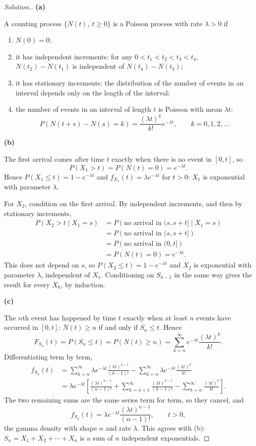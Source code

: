 \documentclass[11pt,a4paper]{article}
\theoremstyle{definition}
\newenvironment{solution}
  {\renewcommand{\qedsymbol}{}\begin{proof}[\textit{Solution}.]}
  {\end{proof}}
\newcommand{\subhead}[1]{%
  \par\medskip\noindent\textbf{#1}\par\nobreak\smallskip}
\begin{document}
\begin{solution}
\subhead{(a)}
A counting process $\{N(t),\ t\geq0\}$ is a Poisson process with rate
$\lambda>0$ if
\begin{enumerate}[label=(\roman*)]
\item $N(0)=0$;
\item it has independent increments: for any $0<t_1<t_2<t_3<t_4$,
$N(t_2)-N(t_1)$ is independent of $N(t_4)-N(t_3)$;
\item it has stationary increments: the distribution of the number of events in
an interval depends only on the length of the interval;
\item the number of events in an interval of length $t$ is Poisson with mean
$\lambda t$:
$$P\left(N(t+s)-N(s)=k\right) = \frac{(\lambda t)^{k}}{k!}e^{-\lambda t},
\qquad k=0,1,2,\dots$$
\end{enumerate}

\subhead{(b)}
The first arrival comes after time $t$ exactly when there is no event in
$[0,t]$, so
$$P(X_1>t) = P\left(N(t)=0\right) = e^{-\lambda t}.$$
Hence $P(X_1\leq t) = 1-e^{-\lambda t}$ and $f_{X_1}(t) = \lambda e^{-\lambda t}$
for $t>0$: $X_1$ is exponential with parameter $\lambda$.

For $X_2$, condition on the first arrival. By independent increments, and
then by stationary increments,
\begin{align*}
P(X_2>t\mid X_1=s) &= P\left(\text{no arrival in }(s,s+t]\mid X_1=s\right)\\
&= P\left(\text{no arrival in }(s,s+t]\right)\\
&= P\left(\text{no arrival in }(0,t]\right)\\
&= P\left(N(t)=0\right) = e^{-\lambda t}.
\end{align*}
This does not depend on $s$, so $P(X_2\leq t) = 1-e^{-\lambda t}$ and $X_2$ is
exponential with parameter $\lambda$, independent of $X_1$. Conditioning on
$S_{k-1}$ in the same way gives the result for every $X_k$, by induction.

\subhead{(c)}
The $n$th event has happened by time $t$ exactly when at least $n$ events have
occurred in $[0,t]$: $N(t)\geq n$ if and only if $S_n\leq t$. Hence
$$F_{S_n}(t) = P(S_n\leq t) = P\left(N(t)\geq n\right)
= \sum_{k=n}^{\infty}e^{-\lambda t}\frac{(\lambda t)^{k}}{k!}.$$
Differentiating term by term,
\begin{align*}
f_{S_n}(t) &= \sum_{k=n}^{\infty}\lambda e^{-\lambda t}\frac{(\lambda t)^{k-1}}{(k-1)!}
- \sum_{k=n}^{\infty}\lambda e^{-\lambda t}\frac{(\lambda t)^{k}}{k!}\\
&= \lambda e^{-\lambda t}\left[\frac{(\lambda t)^{n-1}}{(n-1)!}
+ \sum_{k=n+1}^{\infty}\frac{(\lambda t)^{k-1}}{(k-1)!}
- \sum_{k=n}^{\infty}\frac{(\lambda t)^{k}}{k!}\right].
\end{align*}
The two remaining sums are the same series term for term, so they cancel, and
$$f_{S_n}(t) = \lambda e^{-\lambda t}\frac{(\lambda t)^{n-1}}{(n-1)!},
\qquad t>0 ,$$
the gamma density with shape $n$ and rate $\lambda$. This agrees with (b):
$S_n = X_1+X_2+\cdots+X_n$ is a sum of $n$ independent exponentials.
\end{solution}
\end{document}
